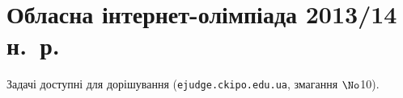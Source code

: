 
\section{Обласна інтернет-олімпіада 2013/14 н.~р.}

Задачі доступні для дорішування (\verb"ejudge.ckipo.edu.ua", змагання $\No$10).

\renewenvironment{problemAllDefault}[1]{\vspace{10mm}\par\begin{problem}{#1}{Клавіатура (stdin)}{Екран (stdout)}{1 сек}{64 мегабайти}}{\end{problem}}

	

	

% 	

% 	


